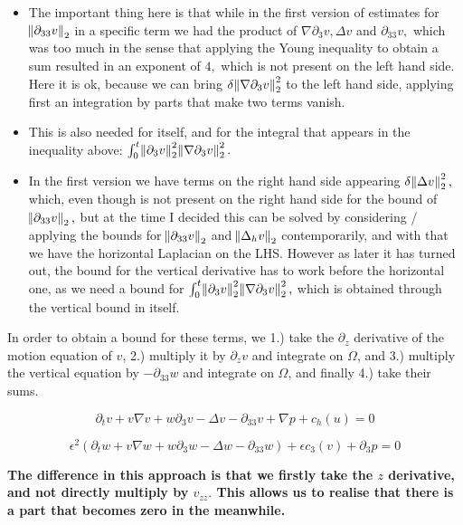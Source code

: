 \documentclass[11pt]{article}
\begin{document}
\begin{itemize}

\item The important thing here is that while in the first version of estimates for $\norm{\partial_{33} v}_2$ in a specific term we had the product of $\nabla \partial_3 v, \Delta v$ and $\partial_{33} v,$ which was too much in the sense that applying the Young inequality to obtain a sum resulted in an exponent of $4,$ which is not present on the left hand side. Here it is ok, because we can bring $\delta \norm{\nabla \partial_3 v}_2^2$ to the left hand side, applying first an integration by parts that make two terms vanish.

\item This is also needed for itself, and for the integral that appears in the inequality above: $\int_0^t \norm{\partial_3 v}^2_2 \norm{\nabla \partial_3 v}^2_2.$

\item In the first version we have terms on the right hand side appearing $ \delta \norm{\Delta v}_2^2,$ which, even though is not present on the right hand side for the bound of $\norm{\partial_{33} v}_2,$ but at the time I decided this can be solved by considering / applying the bounds for  $\norm{\partial_{33} v}_2$ and  $\norm{\Delta_h v}_2$ contemporarily, and with that we have the horizontal Laplacian on the LHS. However as later it has turned out, the bound for the vertical derivative has to work before the horizontal one, as we need a bound for $\int_0^t \norm{\partial_3 v}^2_2 \norm{\nabla \partial_3 v}^2_2,$ which is obtained through the vertical bound in itself.

\end{itemize}

In order to obtain a bound for these terms, we 1.) take the $\partial_z$ derivative of the motion equation of $v$, 2.) multiply it by $\partial_z v$ and integrate on $\Omega$, and 3.) multiply the vertical equation by $-\partial_{33} w$ and integrate on $\Omega$, and finally 4.) take their sums.

$$ \partial_t v + v \nabla v + w \partial_3 v - \Delta v - \partial_{33} v + \nabla p + c_h (u) = 0$$

$$ \epsilon^2 (\partial_t w + v \nabla w + w \partial_3 w - \Delta w - \partial_{33} w) + \epsilon c_3 (v) + \partial_3 p = 0$$

\textbf{The difference in this approach is that we firstly take the $z$ derivative, and not directly multiply by $v_{zz}.$ This allows us to realise that there is a part that becomes zero in the meanwhile.}
\end{document}
